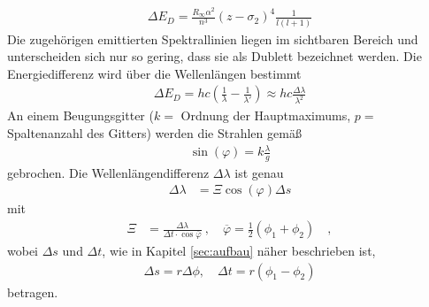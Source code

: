 \begin{align}
	\Delta E_D = \frac{R_\infty\alpha^2}{n^3}(z-\sigma_2)^4\frac{1}{l(l+1)}
\end{align}
Die zugehörigen emittierten Spektrallinien liegen im sichtbaren Bereich und unterscheiden sich nur so gering, dass sie als Dublett bezeichnet werden. Die Energiedifferenz wird über die Wellenlängen bestimmt
\begin{align}
	\Delta E_D = hc\left(\frac{1}{\lambda}-\frac{1}{\lambda'}\right) \approx hc\frac{\Delta \lambda}{\lambda^2}
\end{align}
An einem Beugungsgitter ($k =$ Ordnung der Hauptmaximums, $p =$ Spaltenanzahl des Gitters) werden die Strahlen gemäß
\begin{align}
	\sin(\varphi) = k\frac{\lambda}{g}
\end{align}
gebrochen.
Die Wellenlängendifferenz $\Delta \lambda$ ist genau
\begin{align}
	\Delta \lambda &= \Xi \cos(\varphi)\Delta s
\end{align}	
mit
\begin{align}
	\Xi &= \frac{\Delta\lambda}{\Delta t\cdot\cos\overline{\varphi}} \ , \quad \overline{\varphi} = \frac{1}{2}(\phi_1 + \phi_2) \quad ,
\end{align}
wobei $\Delta s$ und $\Delta t$, wie in Kapitel \ref{sec:aufbau} näher beschrieben ist,
\begin{align}
	\Delta s = r \Delta \phi , \quad \Delta t = r (\phi_1 - \phi_2)
\end{align}
betragen.
